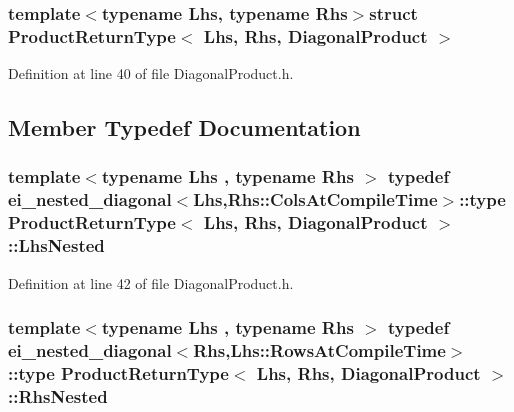 \subsubsection*{template$<$typename Lhs, typename Rhs$>$struct Product\-Return\-Type$<$ Lhs, Rhs, Diagonal\-Product $>$}



Definition at line 40 of file Diagonal\-Product.\-h.



\subsection{Member Typedef Documentation}
\hypertarget{struct_product_return_type_3_01_lhs_00_01_rhs_00_01_diagonal_product_01_4_adb466f67e94e07ae75e102629849e1cf}{
\subsubsection[{Lhs\-Nested}]{\setlength{\rightskip}{0pt plus 5cm}template$<$typename Lhs , typename Rhs $>$ typedef {\bf ei\-\_\-nested\-\_\-diagonal}$<$Lhs,Rhs\-::\-Cols\-At\-Compile\-Time$>$\-::{\bf type} {\bf Product\-Return\-Type}$<$ Lhs, Rhs, {\bf Diagonal\-Product} $>$\-::{\bf Lhs\-Nested}}}\label{struct_product_return_type_3_01_lhs_00_01_rhs_00_01_diagonal_product_01_4_adb466f67e94e07ae75e102629849e1cf}


Definition at line 42 of file Diagonal\-Product.\-h.

\hypertarget{struct_product_return_type_3_01_lhs_00_01_rhs_00_01_diagonal_product_01_4_ae10e5b01aa73df49634a9c709899958a}{
\subsubsection[{Rhs\-Nested}]{\setlength{\rightskip}{0pt plus 5cm}template$<$typename Lhs , typename Rhs $>$ typedef {\bf ei\-\_\-nested\-\_\-diagonal}$<$Rhs,Lhs\-::\-Rows\-At\-Compile\-Time$>$\-::{\bf type} {\bf Product\-Return\-Type}$<$ Lhs, Rhs, {\bf Diagonal\-Product} $>$\-::{\bf Rhs\-Nested}}}\label{struct_product_return_type_3_01_lhs_00_01_rhs_00_01_diagonal_product_01_4_ae10e5b01aa73df49634a9c709899958a}


